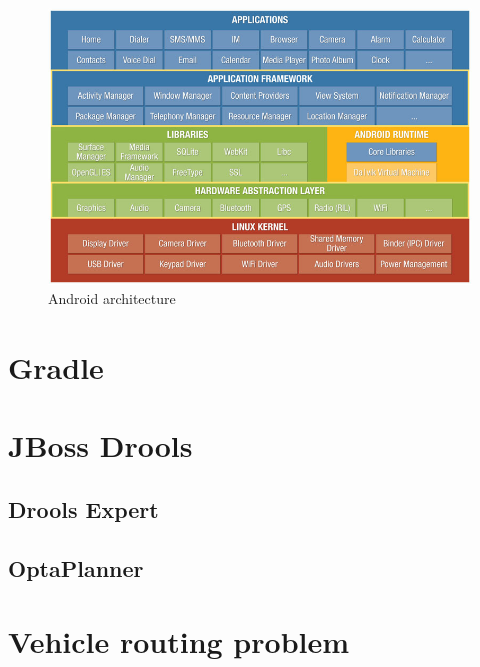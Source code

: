 \begin{figure}[h!]
    \centering
    \includegraphics[scale=0.5]{fig/android_architecture.jpg}
    \caption{Android architecture}
\end{figure}

\section{Gradle}


\section{JBoss Drools}

  \subsection{Drools Expert}

  \subsection{OptaPlanner}


\section{Vehicle routing problem}

